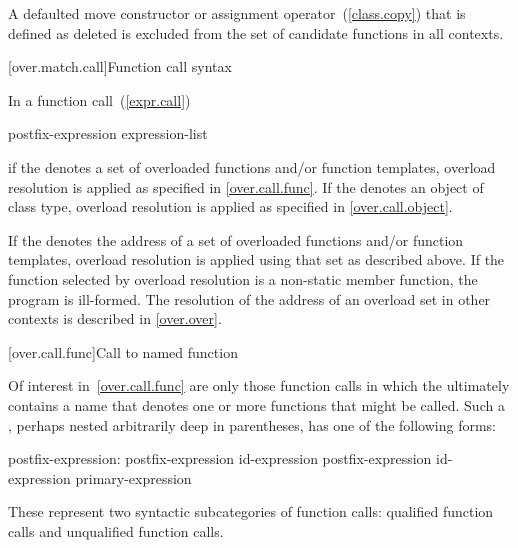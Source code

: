 \pnum
A defaulted move constructor or assignment operator~(\ref{class.copy}) that is
defined as deleted is excluded from the set of candidate functions in all
contexts.

[over.match.call]{Function call syntax}%

\pnum
In a function call~(\ref{expr.call})

\begin{ncsimplebnf}
postfix-expression \terminal{(} expression-list\opt \terminal{)}
\end{ncsimplebnf}

if the  denotes a set of overloaded functions and/or
function templates, overload resolution is applied as specified in \ref{over.call.func}.
If the  denotes an object of class type, overload
resolution is applied as specified in \ref{over.call.object}.

\pnum
If the  denotes the address of a set of overloaded
functions and/or function templates, overload resolution is applied using that set as
described above. If the function selected by overload resolution is a non-static member
function, the program is ill-formed. \enternote The resolution of the address of an
overload set in other contexts is described in \ref{over.over}. \exitnote

[over.call.func]{Call to named function}

\pnum
Of interest in~\ref{over.call.func} are only those function calls in
which the
ultimately contains a name that
denotes one or more functions that might be called.
Such a
,
perhaps nested arbitrarily deep in
parentheses, has one of the following forms:

\begin{ncbnf}
postfix-expression:\br
    postfix-expression  id-expression\br
    postfix-expression \terminal{->} id-expression\br
    primary-expression
\end{ncbnf}

These represent two syntactic subcategories of function calls:
qualified function calls and unqualified function calls.

